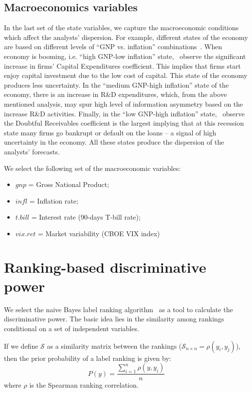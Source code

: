\documentclass[a4paper,twoside,12pt,openright,notitlepage]{report}\usepackage[]{graphicx}\usepackage[]{color}
\begin{document}
\subsection{Macroeconomics variables}
In the last set of the state variables, we  capture the macroeconomic conditions which affect the analysts' dispersion. For example, different states of the economy are based on  different levels of ``GNP vs. inflation'' combinations~\citep{lev1993,hope2005}. When economy is booming, i.e. ``high GNP-low inflation'' state,~\cite{lev1993} observe the significant increase in firms' Capital Expenditures coefficient. This implies that firms start enjoy capital investment due to the low cost of capital. This state of the economy produces less uncertainty. In the ``medium GNP-high inflation'' state of the economy, there is an increase in R\&D expenditures, which, from the above mentioned analysis, may spur high level of information asymmetry based on the increase R\&D activities. Finally, in the ``low GNP-high inflation'' state,~\cite{lev1993} observe the Doubtful Receivables coefficient is the largest implying that at this recession state many firms go bankrupt or default on the loans -- a signal of high uncertainty in the economy. All these states produce the dispersion of the analysts' forecasts.

We select the following set of the macroeconomic variables:
\begin{itemize}
\item $gnp$ = Gross National Product;
\item $infl$ = Inflation rate;
\item $t.bill$ = Interest rate (90-days T-bill rate);
\item $vix.ret$ = Market variability (CBOE VIX index)
\end{itemize}


\section{Ranking-based discriminative power}
\label{ch3-sec:labelranking}


We select the naive Bayes label ranking algorithm~\citep{aiguzhinov2010} as a tool to calculate the discriminative power. The basic idea lies in the similarity  among rankings conditional on a set of independent variables.

If we  define $\mathcal{S}$ as a similarity matrix between the rankings ($\mathcal{S}_{n \times n}=\rho(y_i,y_j)$), then the prior probability of a label ranking is given by:
\begin{equation}
P(y) = \frac{\sum_{i=1}^{n} \rho(y,y_i)}{n}
\end{equation}
where $\rho$ is the Spearman ranking correlation.
\end{document}
